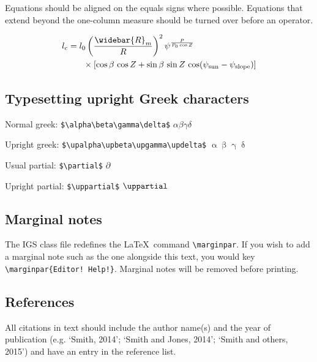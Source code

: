 \documentclass[review,jog]{igs}
\begin{document}
Equations should be aligned on the equals signs where possible. Equations that extend beyond the one-column measure should be turned over before an operator. 

\begin{equation}
\label{eqnarrayexample}
\begin{aligned}
l_c & =  l_0 \left(\frac{\widebar{R}_m}{R} \right)^2
  \psi^{\frac{P}{P_0\cos Z}}\\
    & \phantom{=} \quad  \times [\cos\beta\, \cos Z
    + \sin\beta\,\sin Z\,\cos(\psi_\mathrm{sun}
    - \psi_\mathrm{slope})]
\end{aligned}
\end{equation}

\subsection{Typesetting upright Greek characters}

Normal greek: \verb|$\alpha\beta\gamma\delta$|
$\alpha\beta\gamma\delta$ 

Upright greek:  \verb|$\upalpha\upbeta\upgamma\updelta$|
$\upalpha\upbeta\upgamma\updelta$

Usual partial: \verb|$\partial$| $\partial$

Upright partial: \verb|$\uppartial$| $\uppartial$

\subsection{Marginal notes}

The IGS class file redefines the \LaTeX\ command \verb"\marginpar". If you wish to add a marginal note such as the one alongside this text, you would key \verb"\marginpar{Editor! Help!}". Marginal notes will be removed before printing.

\subsection{References}

All citations in text should include the author name(s) and the year of publication (e.g. `Smith, 2014'; `Smith and Jones, 2014'; `Smith and others, 2015') and have an entry in the reference list. 
\end{document}
